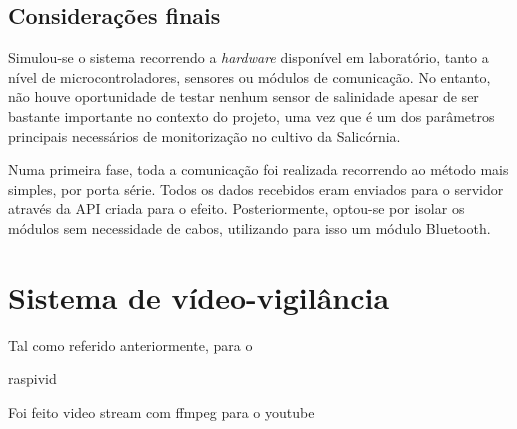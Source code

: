 \subsection{Considerações finais}


Simulou-se o sistema recorrendo a \textit{hardware} disponível em laboratório, tanto a nível de microcontroladores, sensores ou módulos de comunicação. No entanto, não houve oportunidade de testar nenhum sensor de salinidade apesar de ser bastante importante no contexto do projeto, uma vez que é um dos parâmetros principais necessários de monitorização no cultivo da Salicórnia.


Numa primeira fase, toda a comunicação foi realizada recorrendo ao método mais simples, por porta série. Todos os dados recebidos eram enviados para o servidor através da API criada para o efeito. Posteriormente, optou-se por isolar os módulos sem necessidade de cabos, utilizando para isso um módulo Bluetooth. 



















\newpage
\section{Sistema de vídeo-vigilância }




Tal como referido anteriormente, para o 



raspivid



Foi feito video stream com ffmpeg para o youtube 





